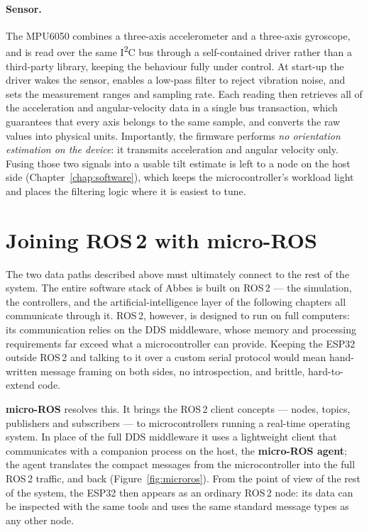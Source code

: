 \paragraph{Sensor.}
The MPU6050 combines a three-axis accelerometer and a three-axis
gyroscope, and is read over the same I\textsuperscript{2}C bus through a
self-contained driver rather than a third-party library, keeping the
behaviour fully under control. At start-up the driver wakes the sensor,
enables a low-pass filter to reject vibration noise, and sets the
measurement ranges and sampling rate. Each reading then retrieves all of
the acceleration and angular-velocity data in a single bus transaction,
which guarantees that every axis belongs to the same sample, and converts
the raw values into physical units. Importantly, the firmware performs
\emph{no orientation estimation on the device}: it transmits acceleration
and angular velocity only. Fusing those two signals into a usable tilt
estimate is left to a node on the host side
(Chapter~\ref{chap:software}), which keeps the microcontroller's workload
light and places the filtering logic where it is easiest to tune.

\section{Joining ROS\,2 with micro-ROS}
\label{sec:fw-microros}
The two data paths described above must ultimately connect to the rest of
the system. The entire software stack of Abbes is built on ROS\,2 --- the
simulation, the controllers, and the artificial-intelligence layer of the
following chapters all communicate through it. ROS\,2, however, is
designed to run on full computers: its communication relies on the DDS
middleware, whose memory and processing requirements far exceed what a
microcontroller can provide. Keeping the ESP32 outside ROS\,2 and talking
to it over a custom serial protocol would mean hand-written message
framing on both sides, no introspection, and brittle, hard-to-extend
code.

\textbf{micro-ROS} resolves this. It brings the ROS\,2 client concepts
--- nodes, topics, publishers and subscribers --- to microcontrollers
running a real-time operating system. In place of the full DDS middleware
it uses a lightweight client that communicates with a companion process
on the host, the \textbf{micro-ROS agent}; the agent translates the
compact messages from the microcontroller into the full ROS\,2 traffic,
and back (Figure~\ref{fig:microros}). From the point of view of the rest
of the system, the ESP32 then appears as an ordinary ROS\,2 node: its
data can be inspected with the same tools and uses the same standard
message types as any other node.

